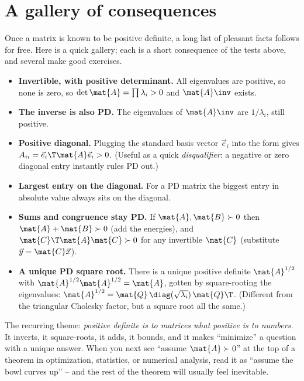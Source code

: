 \section{A gallery of consequences}

Once a matrix is known to be positive definite, a long list of pleasant facts follows for free.
Here is a quick gallery; each is a short consequence of the tests above, and several make good
exercises.

\begin{itemize}
  \item \textbf{Invertible, with positive determinant.} All eigenvalues are positive, so none is
  zero, so $\det\mat{A} = \prod\lambda_i > 0$ and $\mat{A}\inv$ exists.
  \item \textbf{The inverse is also PD.} The eigenvalues of $\mat{A}\inv$ are $1/\lambda_i$, still
  positive.
  \item \textbf{Positive diagonal.} Plugging the standard basis vector $\vec{e}_i$ into the form
  gives $A_{ii} = \vec{e}_i\T\mat{A}\vec{e}_i > 0$. (Useful as a quick \emph{disqualifier}: a
  negative or zero diagonal entry instantly rules PD out.)
  \item \textbf{Largest entry on the diagonal.} For a PD matrix the biggest entry in absolute value
  always sits on the diagonal.
  \item \textbf{Sums and congruence stay PD.} If $\mat{A},\mat{B}\succ0$ then $\mat{A}+\mat{B}\succ0$
  (add the energies), and $\mat{C}\T\mat{A}\mat{C}\succ0$ for any invertible $\mat{C}$ (substitute
  $\vec{y}=\mat{C}\vec{x}$).
  \item \textbf{A unique PD square root.} There is a unique positive definite $\mat{A}^{1/2}$ with
  $\mat{A}^{1/2}\mat{A}^{1/2}=\mat{A}$, gotten by square-rooting the eigenvalues:
  $\mat{A}^{1/2}=\mat{Q}\,\diag(\sqrt{\lambda_i})\,\mat{Q}\T$. (Different from the triangular Cholesky
  factor, but a square root all the same.)
\end{itemize}

\begin{focusbox}
The recurring theme: \emph{positive definite is to matrices what positive is to numbers.} It
inverts, it square-roots, it adds, it bounds, and it makes ``minimize'' a question with a unique
answer. When you next see ``assume $\mat{A}\succ0$'' at the top of a theorem in optimization,
statistics, or numerical analysis, read it as ``assume the bowl curves up'' -- and the rest of the
theorem will usually feel inevitable.
\end{focusbox}

